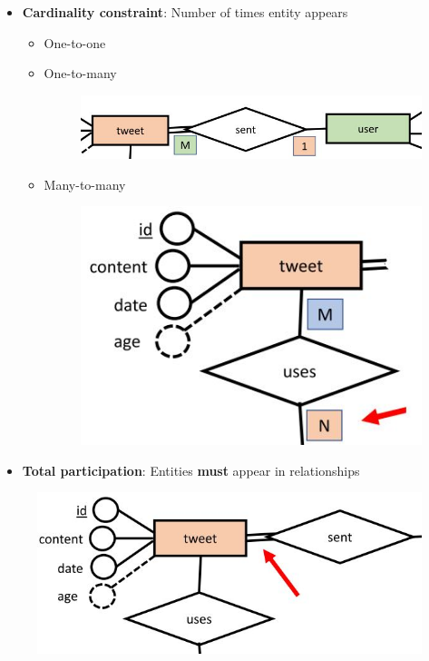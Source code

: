 \documentclass[conference]{IEEEtran}
\begin{document}
\begin{itemize}
    \item \textbf{Cardinality constraint}: Number of times entity appears 
    \begin{itemize}
        \item One-to-one
        \item One-to-many
        \begin{figure} [h!]
            \centering
            \includegraphics[scale=0.4]{Ex8.JPG}
        \end{figure}
        \item Many-to-many
        \begin{figure} [h!]
            \centering
            \includegraphics[scale=0.4]{Ex9.JPG}
        \end{figure}
    \end{itemize}
    \item \textbf{Total participation}: Entities \textbf{must} appear in relationships
\end{itemize}
\begin{figure} [h!]
    \centering
    \includegraphics[scale=0.4]{Ex7.JPG}
\end{figure}
\end{document}
